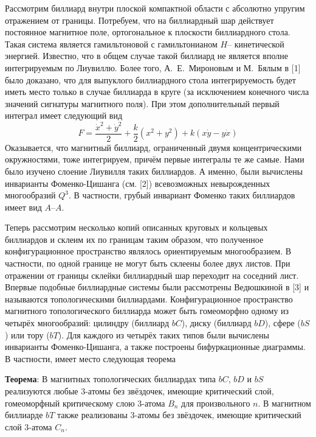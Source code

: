 



\vzmscaption

Рассмотрим биллиард внутри плоской компактной области с абсолютно упругим отражением от границы. Потребуем, что на биллиардный шар действует постоянное магнитное поле, ортогональное к плоскости биллиардного стола. Такая система является гамильтоновой с гамильтонианом $H$-- кинетической энергией. Известно, что в общем случае такой биллиард не является вполне интегрируемым по Лиувиллю. Более того, А.~Е.~Мироновым и М.~Бялым в [1] было доказано, что для выпуклого биллиардного стола интегрируемость будет иметь место только в случае биллиарда в круге (за исключением конечного числа значений сигнатуры магнитного поля). При этом дополнительный первый интеграл имеет следующий вид
$$F=\frac{\dot{x}^2+\dot{y}^2}{2}+\frac{k}{2}(x^2+y^2)+k(x\dot{y}-y\dot{x})$$
Оказывается, что магнитный биллиард, ограниченный двумя концентрическими окружностями, тоже интегрируем, причём первые интегралы те же самые. Нами было изучено слоение Лиувилля таких биллиардов. А именно, были вычислены инварианты Фоменко-Цишанга (см. [2]) всевозможных невырожденных многообразий $Q^3$. В частности, грубый инвариант Фоменко таких биллиардов имеет вид $A$--$A$.

Теперь рассмотрим несколько копий описанных круговых и кольцевых биллиардов и склеим их по границам таким образом, что полученное конфигурационное пространство являлось ориентируемым многообразием. В частности, по одной границе не могут быть склеены более двух листов. При отражении от границы склейки биллиардный шар переходит на соседний лист. Впервые подобные биллиардные системы были рассмотрены Ведюшкиной в [3] и называются топологическими биллиардами. Конфигурационное пространство магнитного топологического биллиарда может быть гомеоморфно одному из четырёх многообразий: цилиндру (биллиард $bC$), диску (биллиард $bD$), сфере ($bS$) или тору ($bT$). Для каждого из четырёх таких типов были вычислены инварианты Фоменко-Цишанга, а также построены бифуркационные диаграммы. В частности, имеет место следующая теорема

\textbf{Теорема}: В магнитных топологических биллиардах типа $bC$, $bD$ и $bS$ реализуются любые 3-атомы без звёздочек, имеющие критический слой, гомеоморфный критическому слою 3-атома $B_n$ для произвольного $n$. В магнитном биллиарде $bT$ также реализованы 3-атомы без звёздочек, имеющие критический слой 3-атома $C_n$.


